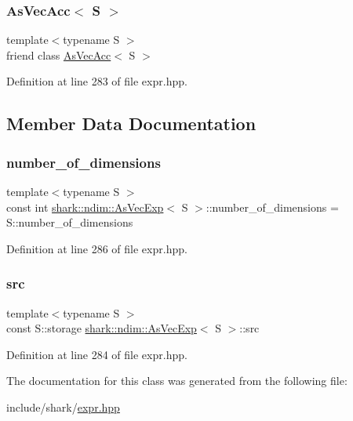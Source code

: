 \subsubsection{\texorpdfstring{As\+Vec\+Acc$<$ S $>$}{AsVecAcc< S >}}
{\footnotesize\ttfamily template$<$typename S $>$ \\
friend class \hyperlink{classshark_1_1ndim_1_1_as_vec_acc}{As\+Vec\+Acc}$<$ S $>$\hspace{0.3cm}{\ttfamily [friend]}}



Definition at line 283 of file expr.\+hpp.



\subsection{Member Data Documentation}
\hypertarget{classshark_1_1ndim_1_1_as_vec_exp_3_01_s_01_4_ab20bf5b87d7ea7464eb4cdacd185e1a2}{}\label{classshark_1_1ndim_1_1_as_vec_exp_3_01_s_01_4_ab20bf5b87d7ea7464eb4cdacd185e1a2} 
\subsubsection{\texorpdfstring{number\+\_\+of\+\_\+dimensions}{number\_of\_dimensions}}
{\footnotesize\ttfamily template$<$typename S $>$ \\
const int \hyperlink{classshark_1_1ndim_1_1_as_vec_exp}{shark\+::ndim\+::\+As\+Vec\+Exp}$<$ S $>$\+::number\+\_\+of\+\_\+dimensions = S\+::number\+\_\+of\+\_\+dimensions\hspace{0.3cm}{\ttfamily [static]}}



Definition at line 286 of file expr.\+hpp.

\hypertarget{classshark_1_1ndim_1_1_as_vec_exp_3_01_s_01_4_aa80febebc38b07290aac9a41c7762252}{}\label{classshark_1_1ndim_1_1_as_vec_exp_3_01_s_01_4_aa80febebc38b07290aac9a41c7762252} 
\subsubsection{\texorpdfstring{src}{src}}
{\footnotesize\ttfamily template$<$typename S $>$ \\
const S\+::storage \hyperlink{classshark_1_1ndim_1_1_as_vec_exp}{shark\+::ndim\+::\+As\+Vec\+Exp}$<$ S $>$\+::src\hspace{0.3cm}{\ttfamily [private]}}



Definition at line 284 of file expr.\+hpp.



The documentation for this class was generated from the following file\+:\begin{DoxyCompactItemize}
\item 
include/shark/\hyperlink{expr_8hpp}{expr.\+hpp}\end{DoxyCompactItemize}
